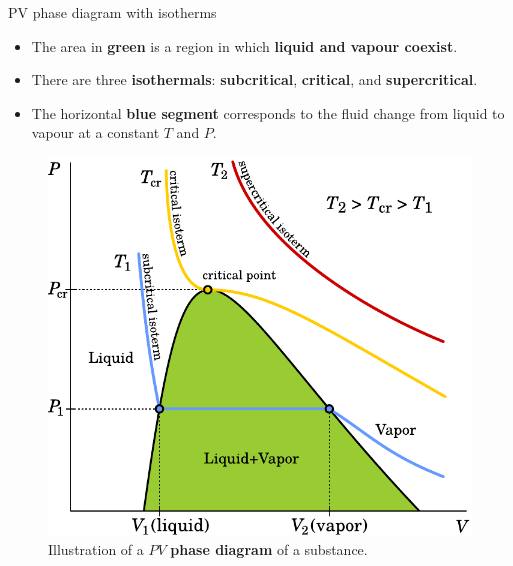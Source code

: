 \begin{frame}{PV phase diagram with isotherms}

\lcol
\begin{itemize}
\item The area in \textbf{green} is a region
in which \textbf{\alert{liquid and vapour coexist}}.
\item There are three \textbf{isothermals}: \alert{\textbf{subcritical}},
\alert{\textbf{critical}}, and \alert{\textbf{supercritical}}. 
\item The horizontal  \textbf{blue segment} corresponds to the fluid change from liquid to vapour at a constant $T$ and $P$. 
\end{itemize}
\rcol

\begin{figure}
\centering 
\includegraphics[width=1\textwidth]{figures/activity-models/phase-diagram-pv}
\caption*{\footnotesize Illustration of a $PV$ \textbf{phase diagram} of a substance.}
\end{figure}

\ecol
\end{frame}
%
